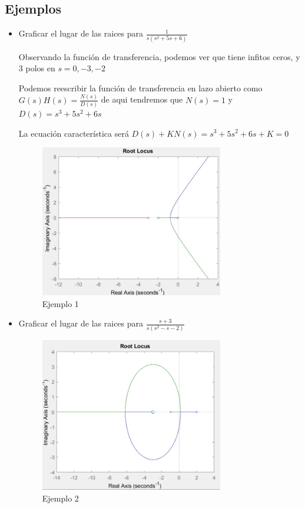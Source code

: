 \documentclass[12pt]{article}
\begin{document}
\subsection{Ejemplos}
\begin{itemize}
    \item Graficar el lugar de las raices para $\frac{1}{s(s^2+5s+6)}$
    
    Observando la función de transferencia, podemos ver que tiene infitos ceros, y 3 polos en $s=0,-3,-2$

    Podemos reescribir la función de transferencia en lazo abierto como $G(s)H(s)=\frac{N(s)}{D(s)}$ de aqui tendremos que $N(s)= 1$ y $D(s)= s^3+5s^2 +6s$
    
    La ecuación característica será $D(s)+KN(s)=s^3+5s^2+6s+K = 0$
    
    \begin{figure}[h]
        \centering
            \includegraphics[width=8cm]{IMAGENES/locus1}
            \caption{Ejemplo 1}
    \end{figure}
    
    \item Graficar el lugar de las raices para $\frac{s+3}{s(s^2-s-2)}$
    
    \begin{figure}[h]
        \centering
            \includegraphics[width=8cm]{IMAGENES/locus2}
            \caption{Ejemplo 2}
    \end{figure}


\end{itemize}
\end{document}
